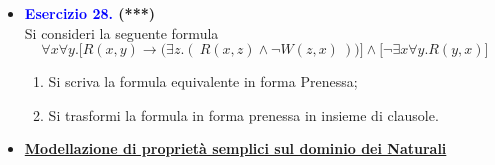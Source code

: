 \documentclass[a4paper,10pt]{article}
\makeatletter
\newcommand{\EsercitazioneNum}{12}
\newcommand{\Data}{04/12/2025}
\newcommand{\DocType}{Esercitazione} %
\newcommand{\FullTitle}{\DocType\ \EsercitazioneNum}
\newcommand{\Header}{
\noindent
  \small \textbf{Computabilità, Complessità e Logica - a.a. 2025/26} \hfill \textbf{\FullTitle} \\[0.2cm]
  \scriptsize Matteo Liotta, \texttt{matteo.liotta@studenti.units.it} \hfill \Data \\[0.2cm]
  \noindent\makebox[\linewidth]{\rule{\linewidth}{0.4pt}} \\[0.3cm]}
\newcommand{\NewPageHeader}{
  \vfill
  \noindent\makebox[\linewidth]{\rule{\linewidth}{0.4pt}}
  \newpage
  {\Header}
}
\makeatother
\begin{document}
{\begin{itemize}[label=, leftmargin=0pt]
\begin{osservazioni}
    
    \end{osservazioni}
    \NewPageHeader
    \begin{osservazioni}
    $$ \exists  x\exists y\forall w.\bigg( R(y)\land \overline S(x,w) \land \overline P(x)\bigg)\ \equiv$$
    A questo punto, fissiamo il valore di $x$ ed $y$ ad una costante:

    $$ \forall w.\bigg( R(c_2)\land \overline S(c_1,w) \land \overline P(c_1)\bigg)\ \equiv$$

    E scriviamo la formula in forma di clausole:

    $$ \{R(c_2)\},\  \{\overline S(c_1,w)\},\ \{\overline P(c_1)\}$$
    \end{osservazioni}

    
    \item \textbf{\textcolor{blue}{Esercizio 28.} (***)} \\ 
    Si consideri la seguente formula 
    $$\forall x\forall y.\bigg[ R(x,y)\rightarrow\bigg(\exists z.(\ R(x,z) \land \lnot W (z,x)\ ) \bigg) \bigg] \land \bigg[ \lnot\exists x\forall y.R(y,x)\bigg]$$
    \begin{enumerate}
        \item Si scriva la formula equivalente in forma Prenessa;
        \item Si trasformi la formula in forma prenessa in insieme di clausole.\\[0.1cm]
    \end{enumerate}
    
    \item \textbf{\underline{Modellazione di proprietà semplici sul dominio dei Naturali}}




\end{itemize}}
\end{document}
